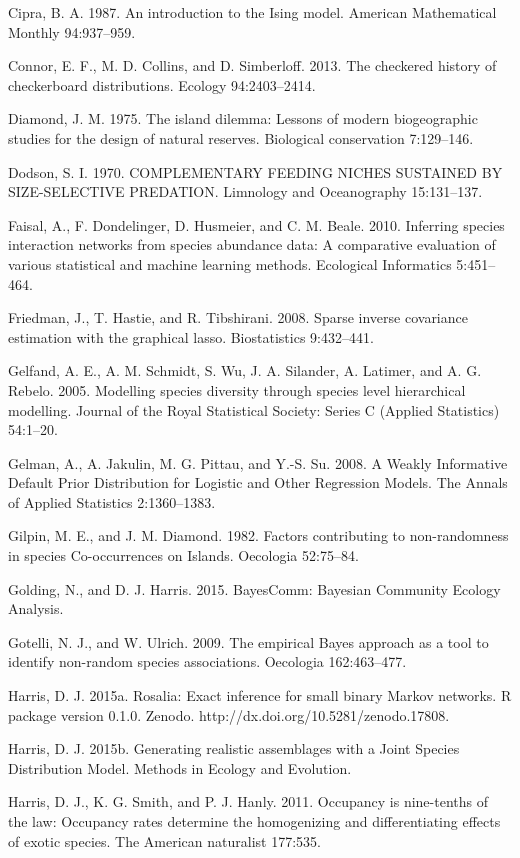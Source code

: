 \documentclass[12pt,]{article}
\begin{document}
\begin{spacing}{1.9}
\begin{flushleft}
Cipra, B. A. 1987. An introduction to the Ising model. American
Mathematical Monthly 94:937--959.

Connor, E. F., M. D. Collins, and D. Simberloff. 2013. The checkered
history of checkerboard distributions. Ecology 94:2403--2414.

Diamond, J. M. 1975. The island dilemma: Lessons of modern biogeographic
studies for the design of natural reserves. Biological conservation
7:129--146.

Dodson, S. I. 1970. COMPLEMENTARY FEEDING NICHES SUSTAINED BY
SIZE-SELECTIVE PREDATION. Limnology and Oceanography 15:131--137.

Faisal, A., F. Dondelinger, D. Husmeier, and C. M. Beale. 2010.
Inferring species interaction networks from species abundance data: A
comparative evaluation of various statistical and machine learning
methods. Ecological Informatics 5:451--464.

Friedman, J., T. Hastie, and R. Tibshirani. 2008. Sparse inverse
covariance estimation with the graphical lasso. Biostatistics
9:432--441.

Gelfand, A. E., A. M. Schmidt, S. Wu, J. A. Silander, A. Latimer, and A.
G. Rebelo. 2005. Modelling species diversity through species level
hierarchical modelling. Journal of the Royal Statistical Society: Series
C (Applied Statistics) 54:1--20.

Gelman, A., A. Jakulin, M. G. Pittau, and Y.-S. Su. 2008. A Weakly
Informative Default Prior Distribution for Logistic and Other Regression
Models. The Annals of Applied Statistics 2:1360--1383.

Gilpin, M. E., and J. M. Diamond. 1982. Factors contributing to
non-randomness in species Co-occurrences on Islands. Oecologia
52:75--84.

Golding, N., and D. J. Harris. 2015. BayesComm: Bayesian Community
Ecology Analysis.

Gotelli, N. J., and W. Ulrich. 2009. The empirical Bayes approach as a
tool to identify non-random species associations. Oecologia
162:463--477.

Harris, D. J. 2015a. Rosalia: Exact inference for small binary Markov
networks. R package version 0.1.0. Zenodo.
http://dx.doi.org/10.5281/zenodo.17808.

Harris, D. J. 2015b. Generating realistic assemblages with a Joint
Species Distribution Model. Methods in Ecology and Evolution.

Harris, D. J., K. G. Smith, and P. J. Hanly. 2011. Occupancy is
nine-tenths of the law: Occupancy rates determine the homogenizing and
differentiating effects of exotic species. The American naturalist
177:535.


\end{flushleft}
\end{spacing}
\end{document}
